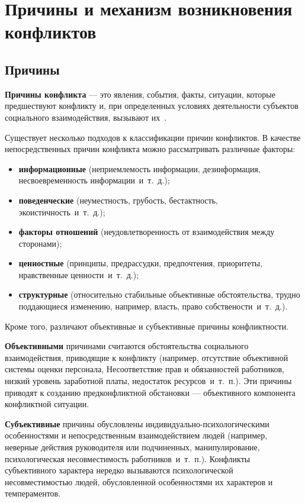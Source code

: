 \chapter{Причины и механизм возникновения конфликтов}

\section{Причины}

\textbf{Причины конфликта} — это явления, события, факты, ситуации, которые
предшествуют конфликту и, при определенных условиях деятельности субъектов
социального взаимодействия, вызывают их~\cite{book04}.

Существует несколько подходов к классификации причин конфликтов. В
качестве непосредственных причин конфликта можно рассматривать различные
факторы:

\begin{itemize}
    \item \textbf{информационные} (неприемлемость информации, дезинформация,
        несвоевременность информации~и~т.~д.);
    \item \textbf{поведенческие} (неуместность, грубость, бестактность,
        экоистичность~и~т.~д.);
    \item \textbf{факторы отношений} (неудовлетворенность от
        взаимодействия между сторонами);
    \item \textbf{ценностные} (принципы, предрассудки, предпочтения,
        приоритеты, нравственные ценности~и~т.~д.);
    \item \textbf{структурные} (относительно стабильные объективные
        обстоятельства, трудно поддающиеся изменению, например, власть, право
        собствености~и~т.~д.).
\end{itemize}

Кроме того, различают объективные и субъективные причины конфликтности.

\textbf{Объективными} причинами считаются обстоятельства социального взаимодействия,
приводящие к конфликту (например, отсутствие объективной системы оценки
персонала, Несоответствие прав и обязанностей работников, низкий уровень
заработной платы, недостаток ресурсов~и~т.~п.). Эти причины приводят к созданию
предконфликтной обстановки --- объективного компонента конфликтной ситуации.

\textbf{Субъективные} причины обусловлены индивидуально-психологическими
особенностями и непосредственным взаимодействием людей (например, неверные
действия руководителя или подчиненных, манипулирование, психологическая
несовместимость работников~и~т.~п.). Конфликты субъективного характера нередко
вызываются психологической несовместимостью людей, обусловленной особенностями
их характеров и темпераментов.

